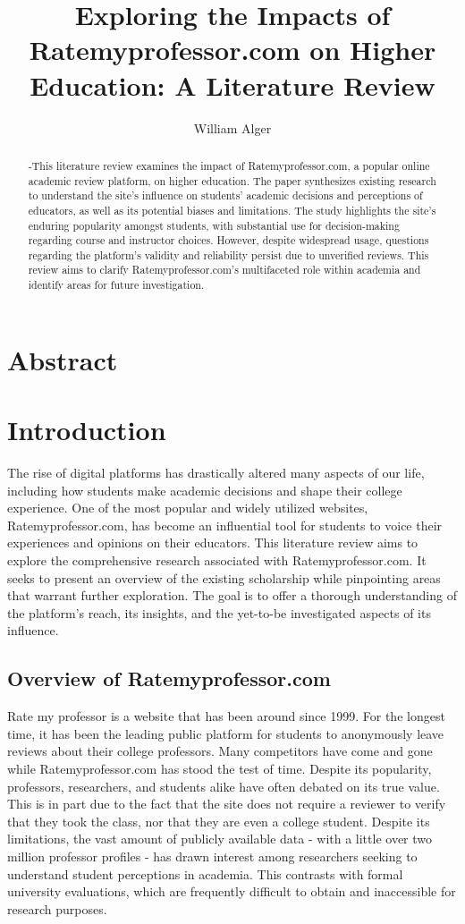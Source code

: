 \documentclass[doc,12pt, twocolumn]{apa7}
\title{Exploring the Impacts of Ratemyprofessor.com on Higher Education: A Literature Review}
\author{William Alger}
\affiliation{Northern Kentucky University}
\begin{document}
\maketitle

\section{Abstract}
\begin{abstract}
-This literature review examines the impact of Ratemyprofessor.com, a popular online academic review platform, on higher education. The paper synthesizes existing research to understand the site's influence on students' academic decisions and perceptions of educators, as well as its potential biases and limitations. The study highlights the site's enduring popularity amongst students, with substantial use for decision-making regarding course and instructor choices. However, despite widespread usage, questions regarding the platform's validity and reliability persist due to unverified reviews. This review aims to clarify Ratemyprofessor.com's multifaceted role within academia and identify areas for future investigation.
\end{abstract}

\section{Introduction}
The rise of digital platforms has drastically altered many aspects of our life, including how students make academic decisions and shape their college experience. One of the most popular and widely utilized websites, Ratemyprofessor.com, has become an influential tool for students to voice their experiences and opinions on their educators. This literature review aims to explore the comprehensive research associated with Ratemyprofessor.com. It seeks to present an overview of the existing scholarship while pinpointing areas that warrant further exploration. The goal is to offer a thorough understanding of the platform's reach, its insights, and the yet-to-be investigated aspects of its influence.

\subsection{Overview of Ratemyprofessor.com}
Rate my professor is a website that has been around since 1999. For the longest time, it has been the leading public platform for students to anonymously leave reviews about their college professors. Many competitors have come and gone while Ratemyprofessor.com has stood the test of time. Despite its popularity, professors, researchers, and students alike have often debated on its true value. This is in part due to the fact that the site does not require a reviewer to verify that they took the class, nor that they are even a college student. Despite its limitations, the vast amount of publicly available data - with a little over two million professor profiles - has drawn interest among researchers seeking to understand student perceptions in academia. This contrasts with formal university evaluations, which are frequently difficult to obtain and inaccessible for research purposes.
\end{document}
